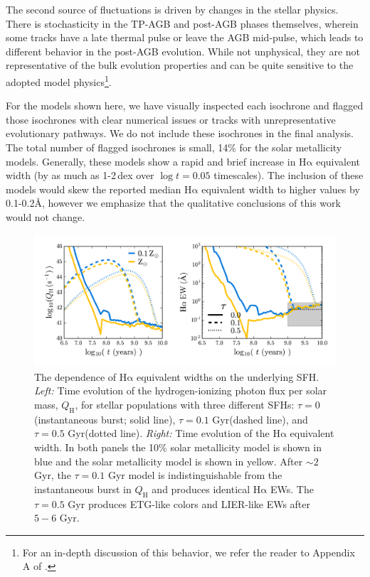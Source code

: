 \documentclass[preprint2]{aastex62}
\newcommand{\ha}{\ensuremath{\mathrm{H\alpha}}\xspace}
\newcommand{\ang}{\ensuremath{\mbox{\AA}}\xspace}
\newcommand{\QH}{\ensuremath{Q_{\mathrm{H}}}\xspace}
\newcommand{\Gyr}{$\,$Gyr\xspace}
\begin{document}
The second source of fluctuations is driven by changes in the stellar physics. There is stochasticity in the TP-AGB and post-AGB phases themselves, wherein some tracks have a late thermal pulse or leave the AGB mid-pulse, which leads to different behavior in the post-AGB evolution. While not unphysical, they are not representative of the bulk evolution properties and can be quite sensitive to the adopted model physics\footnote{For an in-depth discussion of this behavior, we refer the reader to Appendix A of \citet{Choi+2016}.}.

For the models shown here, we have visually inspected each isochrone and flagged those isochrones with clear numerical issues or tracks with unrepresentative evolutionary pathways. We do not include these isochrones in the final analysis. The total number of flagged isochrones is small, 14\% for the solar metallicity models. Generally, these models show a rapid and brief increase in \ha equivalent width (by as much as 1-2\,dex over $\log t = 0.05$ timescales). The inclusion of these models would skew the reported median \ha equivalent width to higher values by 0.1-0.2\ang, however we emphasize that the qualitative conclusions of this work would not change.

\begin{figure}[ht]
  \begin{center}
    \includegraphics[width=\linewidth]{figs/f6.png}
    \caption{{\sc The dependence of \ha equivalent widths on the underlying SFH.} \emph{Left:} Time evolution of the hydrogen-ionizing photon flux per solar mass, \QH, for stellar populations with three different SFHs: $\tau = 0$ (instantaneous burst; solid line), $\tau=0.1\,$\Gyr (dashed line), and $\tau=0.5\,$\Gyr (dotted line). \emph{Right:} Time evolution of the \ha equivalent width. In both panels the 10\% solar metallicity model is shown in blue and the solar metallicity model is shown in yellow. After ${\sim}2\,$\Gyr, the $\tau = 0.1\,$\Gyr model is indistinguishable from the instantaneous burst in \QH and produces identical \ha EWs. The $\tau = 0.5\,$\Gyr produces ETG-like colors and LIER-like EWs after $5-6\,$\Gyr.
    }
    \label{fig:tau}
  \end{center}
\end{figure}
\end{document}
